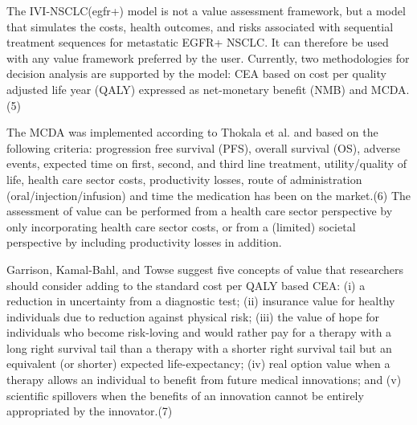 \documentclass[11pt,final,fleqn]{article}\usepackage[]{graphicx}\usepackage[]{color}
\theoremstyle{plain}
\begin{document}
{The IVI-NSCLC(egfr+) model is not a value assessment framework, but a model that simulates the costs, health outcomes, and risks associated with sequential treatment sequences for metastatic EGFR+ NSCLC. It can therefore be used with any value framework preferred by the user. Currently, two methodologies for decision analysis are supported by the model: CEA based on cost per quality adjusted life year (QALY) expressed as net-monetary benefit (NMB) and MCDA.(5) 

The MCDA was implemented according to Thokala et al. and based on the following criteria: progression free survival (PFS), overall survival (OS), adverse events, expected time on first, second, and third line treatment, utility/quality of life, health care sector costs, productivity losses, route of administration (oral/injection/infusion) and time the medication has been on the market.(6) The assessment of value can be performed from a health care sector perspective by only incorporating health care sector costs, or from a (limited) societal perspective by including productivity losses in addition.

Garrison, Kamal-Bahl, and Towse suggest five concepts of value that researchers should consider adding to the standard cost per QALY based CEA: (i) a reduction in uncertainty from a diagnostic test; (ii) insurance value for healthy individuals due to reduction against physical risk; (iii) the value of hope for individuals who become risk-loving and would rather pay for a therapy with a long right survival tail than a therapy with a shorter right survival tail but an equivalent (or shorter) expected life-expectancy; (iv) real option value when a therapy allows an individual to benefit from future medical innovations; and (v) scientific spillovers when the benefits of an innovation cannot be entirely appropriated by the innovator.(7)

}
\end{document}

